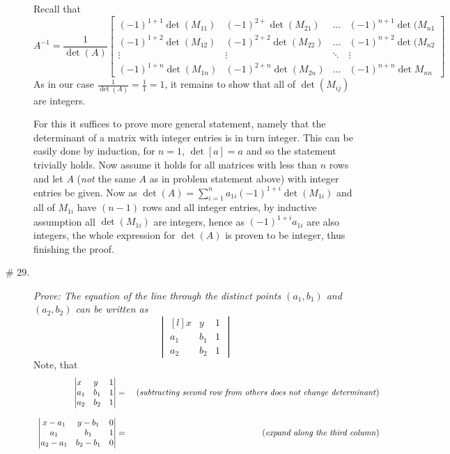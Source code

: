 \documentclass[8pt]{article} %
\begin{document}
\begin{description}
{		Recall that \[A^{-1}=\frac{1}{\det(A)}\begin{bmatrix}(-1)^{1+1}
			\det (M_{11})&(-1)^{2+}\det (M_{21})&\hdots&(-1)^{n+1}\det (M_{n1}\\(-1)^{1+2}\det (M_{12})&(-1)^{2+2}\det (M_{22})&
			\hdots&(-1)^{n+2}\det (M_{n2}\\\vdots&\vdots&\ddots&\vdots\\(-1)^{1+n}\det (M_{1n})&(-1)^{2+n}\det (M_{2n})&\hdots
			&(-1)^{n+n}\det M_{nn}\end{bmatrix}\]
		As in our case $\frac{1}{\det(A)}=\frac{1}{1}=1$, it remains to show that all of $\det(M_{ij})$ are integers. 
		
		For this it suffices to prove more general statement, namely that the determinant of a matrix with integer entries is
		in turn integer. This can be easily done by induction, for $n=1$, $\det[a]=a$ and so the statement trivially holds. Now
		assume it holds for all matrices with less than $n$ rows and let $A$ (\textit{not} the same $A$ as in problem statement above)
		with integer entries be given. Now as $\det(A)=\sum_{i=1}^na_{1i}(-1)^{1+i}\det(M_{1i})$ and all of $M_{1i}$ have $(n-1)$ rows 
		and all integer entries, by inductive assumption all $\det(M_{1i})$ are integers, hence as $(-1)^{1+i}a_{1i}$ are also integers,
		the whole expression for $\det(A)$ is proven to be integer, thus finishing the proof.
		}
	\item[\# 29.]{{\it Prove: The equation of the line through the distinct points $(a_1,b_1)$ and $(a_2,b_2)$ can be written as}
		\[\begin{vmatrix*}[l]x&y&1\\a_1&b_1&1\\a_2&b_2&1\end{vmatrix*}\]
		Note, that
		\[\begin{array}{rr}
		\begin{vmatrix*}[l]x&y&1\\a_1&b_1&1\\a_2&b_2&1\end{vmatrix*}
		= &\mbox{ (\textit{subtracting second row from others does not change determinant})}\\\\
		\begin{vmatrix*}[c]x-a_1&y-b_1&0\\a_1&b_1&1\\a_2-a_1&b_2-b_1&0\end{vmatrix*}
		= &\mbox{ (\textit{expand along the third column})}\\\\

\end{array}\]}
\end{description}
\end{document}
